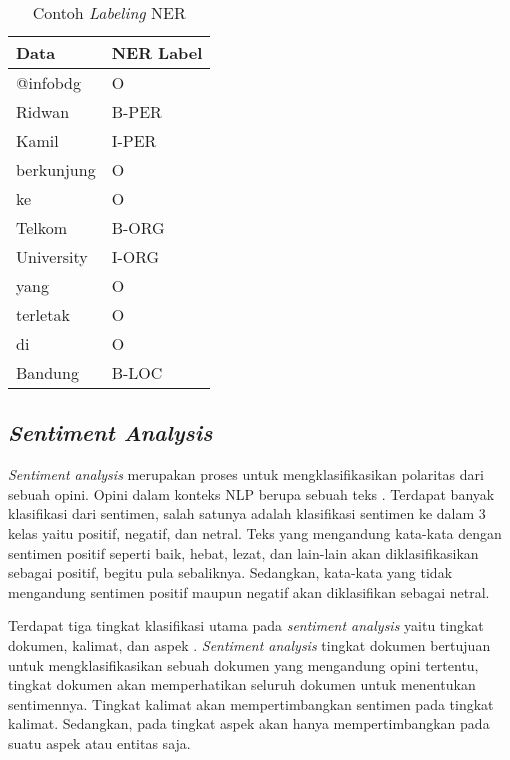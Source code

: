 \begin{table}[h]
    \vspace{0.25cm}
    \caption{Contoh \textit{Labeling} NER \parencite{ner}}
    \label{table:contoh-labeling-ner}
    \begin{center}
        \begin{tabular}{ll}
            \hline
            \textbf{Data} & \textbf{NER Label} \\ \hline
            @infobdg & O \\ \hline
            Ridwan & B-PER \\ \hline
            Kamil & I-PER \\ \hline
            berkunjung & O \\ \hline
            ke & O \\ \hline
            Telkom & B-ORG \\ \hline
            University & I-ORG \\ \hline
            yang & O \\ \hline
            terletak & O \\ \hline
            di & O \\ \hline
            Bandung & B-LOC \\ \hline
        \end{tabular}
    \end{center}
\end{table}

\subsection{\textit{Sentiment Analysis}}

\textit{Sentiment analysis} merupakan proses untuk mengklasifikasikan polaritas dari sebuah opini. Opini dalam konteks NLP berupa sebuah teks \parencite{sentiment_stock}. Terdapat banyak klasifikasi dari sentimen, salah satunya adalah klasifikasi sentimen ke dalam 3 kelas yaitu positif, negatif, dan netral. Teks yang mengandung kata-kata dengan sentimen positif seperti baik, hebat, lezat, dan lain-lain akan diklasifikasikan sebagai positif, begitu pula sebaliknya. Sedangkan, kata-kata yang tidak mengandung sentimen positif maupun negatif akan diklasifikan sebagai netral.

Terdapat tiga tingkat klasifikasi utama pada \textit{sentiment analysis} yaitu tingkat dokumen, kalimat, dan aspek \parencite{sentiment_algo}. \textit{Sentiment analysis} tingkat dokumen bertujuan untuk mengklasifikasikan sebuah dokumen yang mengandung opini tertentu, tingkat dokumen akan memperhatikan seluruh dokumen untuk menentukan sentimennya. Tingkat kalimat akan mempertimbangkan sentimen pada tingkat kalimat. Sedangkan, pada tingkat aspek akan hanya mempertimbangkan pada suatu aspek atau entitas saja.


